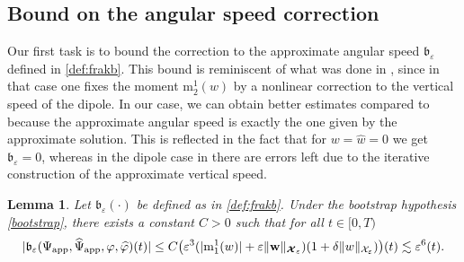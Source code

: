 \documentclass[11pt,reqno,a4paper]{amsart}
\def\eps{\varepsilon}
\newcommand{\cX}{\mathcal{X}}
\newcommand{\mrm}{\mathrm{m}}
\newcommand{\1}{\mathbbm{1}}
\newtheorem{lemma}[proposition]{Lemma}
\theoremstyle{definition}
\theoremstyle{definition}
\numberwithin{equation}{section}
\begin{document}
\subsection{Bound on the angular speed correction}
Our first task is to bound the correction to the approximate angular speed $\mathfrak{b}_\eps$ defined in \cref{def:frakb}.  This bound is reminiscent of what was done in \cite[Lemma 4.7]{dolce2024long}, since in that case one fixes the moment $\mrm^1_2(w)$ by a nonlinear correction to the vertical speed of the dipole. In our case, we can obtain better estimates compared to \cite[Lemma 4.7]{dolce2024long} because the approximate angular speed is exactly the one given by the approximate solution. This is reflected in the fact that for $w=\widehat{w}=0$ we get $\mathfrak{b}_\eps=0$, whereas in the dipole case in \cite{dolce2024long} there are errors left due to the iterative construction of the approximate vertical speed. 
\begin{lemma}
\label{lem:beta}
    Let $\mathfrak{b}_\eps(\cdot)$ be defined as in \cref{def:frakb}. Under the bootstrap hypothesis \cref{bootstrap}, there exists a constant $C>0$ such that for all $t\in [0,T)$
    \begin{align}
    |\mathfrak{b}_{\eps}(\Psi_{\rm app},\widehat{\Psi}_{\rm app}, \varphi,\widehat{\varphi})(t)|\leq C \big(\eps^3(|\mrm^1_1(w)|+\eps\|{\mathbf w}\|_{\boldsymbol{\cX}_\eps})(1+\delta \|w\|_{\cX_\eps})\big)(t)\lesssim \eps^6(t).
    \end{align}
\end{lemma}
\end{document}
